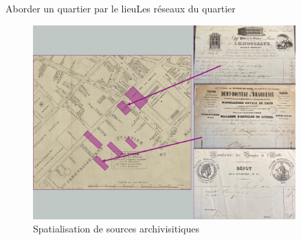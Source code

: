 \documentclass[9pt]{beamer}
\begin{document}
\begin{frame}{Aborder un quartier par le lieu}{Les réseaux du quartier}
	\begin{figure}
		\centering
		\includegraphics[width=0.9\textwidth]{includes/spatial0.png}
		\caption{Spatialisation de sources archivisitiques}
	\end{figure}
\end{frame}
\end{document}
